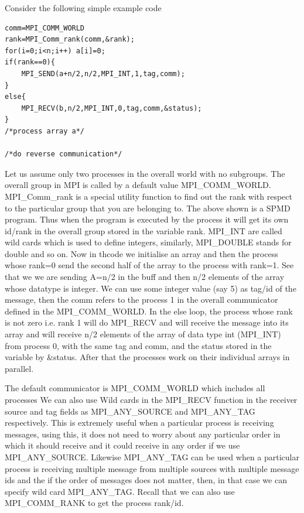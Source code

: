 \documentclass[12pt]{article}
\begin{document}
Consider the following simple example code
\begin{lstlisting}
comm=MPI_COMM_WORLD
rank=MPI_Comm_rank(comm,&rank);
for(i=0;i<n;i++) a[i]=0;
if(rank==0){
    MPI_SEND(a+n/2,n/2,MPI_INT,1,tag,comm);
}
else{
    MPI_RECV(b,n/2,MPI_INT,0,tag,comm,&status);
}
/*process array a*/

/*do reverse communication*/
\end{lstlisting}
Let us assume only two processes in the overall world with no subgroups. The overall group in MPI is called by a default value MPI\_COMM\_WORLD.
MPI\_Comm\_rank is a special utility function to find out the rank with respect to the particular group that you are belonging to. The above shown is a SPMD program. Thus when the program is executed by the process it will get its own id/rank in the overall group stored in the variable rank. MPI\_INT are called wild cards which is used to define integers, similarly, MPI\_DOUBLE stands for double and so on. Now in thcode we initialise an array and then the process whose rank=0 send the second half of the array to the process with rank=1. See that we we are sending A=n/2 in the buff and then n/2 elements of the array whose datatype is integer. We can use some integer value (say 5) as tag/id of the message, then the comm refers to the process 1 in the overall communicator defined in the MPI\_COMM\_WORLD. In the else loop, the process whose rank is not zero i.e. rank 1 will do MPI\_RECV and will receive the message into its array and will receive n/2 elements of the array of data type int (MPI\_INT) from process 0, with the same tag and comm, and the status stored in the variable by \&status. After that the processes work on their individual arrays in parallel.

The default communicator is MPI\_COMM\_WORLD which includes all processes We can also use Wild cards in the MPI\_RECV function in the receiver source and tag fields as MPI\_ANY\_SOURCE and MPI\_ANY\_TAG respectively. This is extremely useful when a particular process is receiving messages, using this, it does not need to worry about any particular order in which it should receive and it could receive in any order if we use MPI\_ANY\_SOURCE. Likewise MPI\_ANY\_TAG can be used when a particular process is receiving multiple message from multiple sources with multiple message ids and the if the order of messages does not matter, then, in that case we can specify wild card MPI\_ANY\_TAG. Recall that we can also use MPI\_COMM\_RANK to get the process rank/id.
\end{document}
